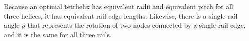 \documentclass[review]{siamonline1116}
\begin{document}
Because an optimal tetrhelix has equivalent radii and equivalent pitch for all three helices,
it has equivalent rail edge lengths. Likewise, there is a single rail angle $\rho$ that
represents the rotation of two nodes connected by a single rail edge, and it is the same
for all three rails.








\end{document}
